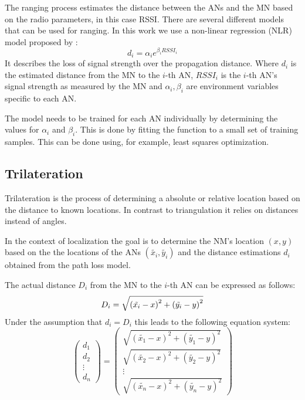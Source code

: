 The ranging process estimates the distance between the ANs and the MN based on the radio parameters, in this case RSSI. There are several different models that can be used for ranging. In this work we use a non-linear regression (NLR) model proposed by \cite{li2015passiveWIFIsource}:
\begin{equation} \label{eqn:non-linear path loss model}
d_{i}=\alpha_{i}e^{\beta_{i}RSSI_{i}}
\end{equation}
It describes the loss of signal strength over the propagation distance. Where \(d_{i}\) is the estimated distance from the MN to the \(i\)-th AN, \(RSSI_{i}\) is the \(i\)-th AN's signal strength as measured by the MN and \(\alpha_{i}, \beta_{i}\) are environment variables specific to each AN.

The model needs to be trained for each AN individually by determining the values for \(\alpha_{i}\) and \(\beta_{i}\). This is done by fitting the function to a small set of training samples. This can be done using, for example, least squares optimization.

\subsection{Trilateration}

Trilateration is the process of determining a absolute or relative location based on the distance to known locations. In contrast to triangulation it relies on distances instead of angles.

In the context of localization the goal is to determine the NM's location \(\left ( x,y \right )\) based on the the locations of the ANs \(\left ( \tilde{x_{i}},\tilde{y_{i}} \right )\) and the distance estimations \(d_{i}\) obtained from the path loss model.

The actual distance \(D_{i}\) from the MN to the \(i\)-th AN can be expressed as follows:
\begin{equation}
D_{i} = \sqrt{\left ( \tilde{x_{i}}-x \right )^{2}+\left ( \tilde{y_{i}}-y \right )^{2}}
\label{eqn: distance MN to AN_{i}}
\end{equation}
Under the assumption that \(d_{i}=D_{i}\)  this leads to the following equation system:
\begin{equation}
\begin{pmatrix}
d_{1}\\ 
d_{2}\\
\vdots\\
d_{n}
\end{pmatrix}
=
\begin{pmatrix}
\sqrt{\left ( \tilde{x_{1}}-x \right )^{2}+\left ( \tilde{y_{1}}-y \right )^{2}}\\
\sqrt{\left ( \tilde{x_{2}}-x \right )^{2}+\left ( \tilde{y_{2}}-y \right )^{2}} \\
\vdots\\
\sqrt{\left ( \tilde{x_{n}}-x \right )^{2}+\left ( \tilde{y_{n}}-y \right )^{2}}
\end{pmatrix}
\label{eqn: trilateration problem as equation system}
\end{equation}

